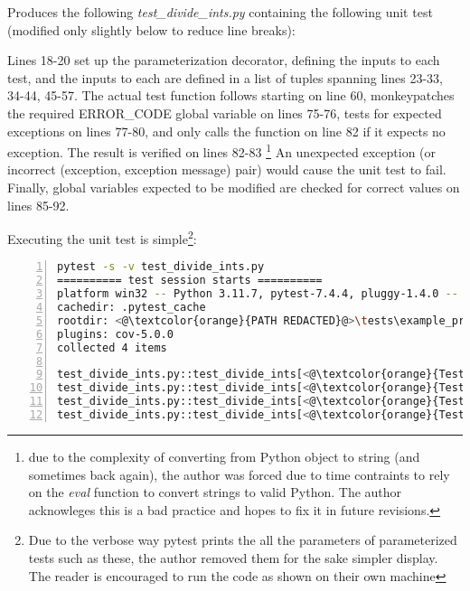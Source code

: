 Produces the following \textit{test\_divide\_ints.py} containing the following 
unit test (modified only slightly below to reduce line breaks):



Lines 18-20 set up the parameterization decorator, defining the inputs to each test,
and the inputs to each are defined in a list of tuples spanning lines 23-33, 
34-44, 45-57.  The actual test function follows starting on line 60, monkeypatches
the required ERROR\_CODE global variable on lines 75-76, tests for expected 
exceptions on lines 77-80, and only calls the function on line 82 if it expects 
no exception. The result is verified on lines 82-83
\footnote{due to the complexity of converting from Python object to string
(and sometimes back again), the author was forced due to time contraints to
rely on the \textit{eval} function to convert strings to valid Python.  
The author acknowleges this is a bad practice and hopes to fix it in
future revisions.} An unexpected exception (or incorrect 
(exception, exception message) 
pair) would cause the unit test to fail.  Finally, global variables expected to be modified 
are checked for correct values on lines 85-92.

Executing the unit test is simple\footnote{Due to the verbose way pytest prints the 
all the parameters of  parameterized tests such as these, the author removed
them for the sake simpler display.  The reader is encouraged to run the code 
as shown on their own machine}:

\begin{lstlisting}[language=bash, numbers=left, caption={Running one of the generated unit tests}]
pytest -s -v test_divide_ints.py
========== test session starts ==========
platform win32 -- Python 3.11.7, pytest-7.4.4, pluggy-1.4.0 -- <@\textcolor{orange}{PATH REDACTED}@>\.venv\Scripts\python.exe
cachedir: .pytest_cache
rootdir: <@\textcolor{orange}{PATH REDACTED}@>\tests\example_procedural_division
plugins: cov-5.0.0
collected 4 items

test_divide_ints.py::test_divide_ints[<@\textcolor{orange}{Test \#1 arguments SNIPPED}@>] <@\textcolor{green}{PASSED}@>
test_divide_ints.py::test_divide_ints[<@\textcolor{orange}{Test \#2 arguments SNIPPED}@>] <@\textcolor{green}{PASSED}@>
test_divide_ints.py::test_divide_ints[<@\textcolor{orange}{Test \#3 arguments SNIPPED}@>] <@\textcolor{green}{PASSED}@>
test_divide_ints.py::test_divide_ints[<@\textcolor{orange}{Test \#4 arguments SNIPPED}@>] <@\textcolor{green}{PASSED}@>
\end{lstlisting}

